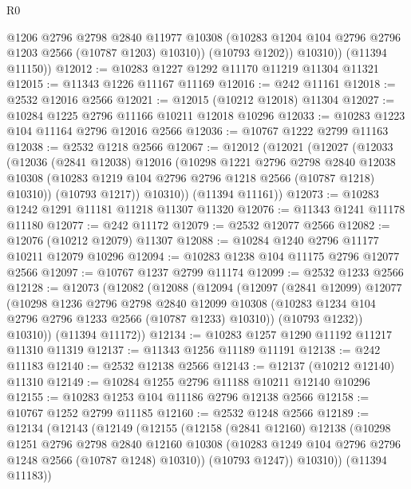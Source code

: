 \begin{lexlean}{R0}
\begin{coremodule}
              @1206
              @2796
              @2798
              @2840
              @11977
              @10308
              (@10283 @1204 @104 @2796 @2796 @1203 @2566 (@10787 @1203) @10310))
            (@10793 @1202))
          @10310))
      (@11394 @11150))
@12012 := @10283 @1227 @1292 @11170 @11219 @11304 @11321
@12015 := @11343 @1226 @11167 @11169
@12016 := @242 @11161
@12018 := @2532 @12016 @2566
@12021 := @12015 (@10212 @12018) @11304
@12027 := @10284 @1225 @2796 @11166 @10211 @12018 @10296
@12033 := @10283 @1223 @104 @11164 @2796 @12016 @2566
@12036 := @10767 @1222 @2799 @11163
@12038 := @2532 @1218 @2566
@12067 := @12012
    (@12021
      (@12027
        (@12033
          (@12036
            (@2841 @12038)
            @12016
            (@10298
              @1221
              @2796
              @2798
              @2840
              @12038
              @10308
              (@10283 @1219 @104 @2796 @2796 @1218 @2566 (@10787 @1218) @10310))
            (@10793 @1217))
          @10310))
      (@11394 @11161))
@12073 := @10283 @1242 @1291 @11181 @11218 @11307 @11320
@12076 := @11343 @1241 @11178 @11180
@12077 := @242 @11172
@12079 := @2532 @12077 @2566
@12082 := @12076 (@10212 @12079) @11307
@12088 := @10284 @1240 @2796 @11177 @10211 @12079 @10296
@12094 := @10283 @1238 @104 @11175 @2796 @12077 @2566
@12097 := @10767 @1237 @2799 @11174
@12099 := @2532 @1233 @2566
@12128 := @12073
    (@12082
      (@12088
        (@12094
          (@12097
            (@2841 @12099)
            @12077
            (@10298
              @1236
              @2796
              @2798
              @2840
              @12099
              @10308
              (@10283 @1234 @104 @2796 @2796 @1233 @2566 (@10787 @1233) @10310))
            (@10793 @1232))
          @10310))
      (@11394 @11172))
@12134 := @10283 @1257 @1290 @11192 @11217 @11310 @11319
@12137 := @11343 @1256 @11189 @11191
@12138 := @242 @11183
@12140 := @2532 @12138 @2566
@12143 := @12137 (@10212 @12140) @11310
@12149 := @10284 @1255 @2796 @11188 @10211 @12140 @10296
@12155 := @10283 @1253 @104 @11186 @2796 @12138 @2566
@12158 := @10767 @1252 @2799 @11185
@12160 := @2532 @1248 @2566
@12189 := @12134
    (@12143
      (@12149
        (@12155
          (@12158
            (@2841 @12160)
            @12138
            (@10298
              @1251
              @2796
              @2798
              @2840
              @12160
              @10308
              (@10283 @1249 @104 @2796 @2796 @1248 @2566 (@10787 @1248) @10310))
            (@10793 @1247))
          @10310))
      (@11394 @11183))

\end{coremodule}
\end{lexlean}
